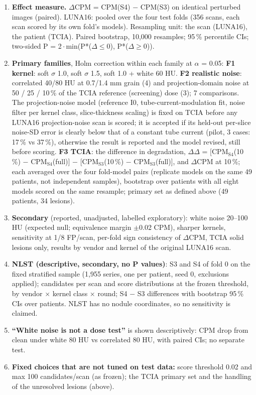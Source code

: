 \begin{enumerate}[label=\arabic*.]
\item \textbf{Effect measure.} $\Delta$CPM = CPM(S4) $-$ CPM(S3) on identical perturbed images (paired). LUNA16: pooled over the
four test folds (356 scans, each scan scored by its own fold's models). Resampling unit: the scan (LUNA16), the patient (TCIA).
Paired bootstrap, 10,000 resamples; 95\,\% percentile CIs; two-sided P = 2\,$\cdot$\,min(P*($\Delta \le 0$), P*($\Delta \ge 0$)).
\item \textbf{Primary families}, Holm correction within each family at $\alpha$ = 0.05:
\textbf{F1 kernel}: soft $\sigma$ 1.0, soft $\sigma$ 1.5, soft 1.0 + white 60 HU.
\textbf{F2 realistic noise}: correlated 40/80 HU at 0.7/1.4 mm grain (4) and projection-domain noise at 50 / 25 / 10\,\% of
the TCIA reference (screening) dose (3); 7 comparisons. The projection-noise model (reference I0, tube-current-modulation fit,
noise filter per kernel class, slice-thickness scaling) is fixed on TCIA before any LUNA16 projection-noise scan is scored; it is
accepted if its held-out per-slice noise-SD error is clearly below that of a constant tube current (pilot, 3 cases: 17\,\% vs
37\,\%), otherwise the result is reported and the model revised, still before scoring.
\textbf{F3 TCIA}: the difference in degradation, $\Delta\Delta$ = [CPM$_\mathrm{S4}$(10\,\%) $-$ CPM$_\mathrm{S4}$(full)]
$-$ [CPM$_\mathrm{S3}$(10\,\%) $-$ CPM$_\mathrm{S3}$(full)], and $\Delta$CPM at 10\,\%; each averaged over the four fold-model
pairs (replicate models on the same 49 patients, not independent samples), bootstrap over patients with all eight models scored
on the same resample; primary set as defined above (49 patients, 34 lesions).
\item \textbf{Secondary} (reported, unadjusted, labelled exploratory): white noise 20--100 HU (expected null; equivalence margin
$\pm$0.02 CPM), sharper kernels, sensitivity at 1/8 FP/scan, per-fold sign consistency of $\Delta$CPM, TCIA solid lesions only,
results by vendor and kernel of the original LUNA16 scan.
\item \textbf{NLST (descriptive, secondary, no P values)}: S3 and S4 of fold 0 on the fixed stratified sample (1,955 series, one
per patient, seed 0, exclusions applied); candidates per scan and score distributions at the frozen threshold, by vendor
$\times$ kernel class $\times$ round; S4 $-$ S3 differences with bootstrap 95\,\% CIs over patients. NLST has no nodule
coordinates, so no sensitivity is claimed.
\item \textbf{``White noise is not a dose test''} is shown descriptively: CPM drop from clean under white 80 HU vs correlated
80 HU, with paired CIs; no separate test.
\item \textbf{Fixed choices that are not tuned on test data:} score threshold 0.02 and max 100 candidates/scan (as frozen); the
TCIA primary set and the handling of the unresolved lesions (above).
\end{enumerate}

